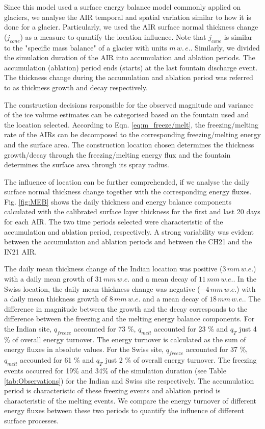 \documentclass[utf8]{frontiersSCNS}
\begin{document}
Since this model used a surface energy balance model commonly applied on glaciers, we analyse the AIR temporal
and spatial variation similar to how it is done for a glacier. Particularly, we used the AIR surface normal
thickness change ($j_{cone}$) as a measure to quantify the location influence. Note that $j_{cone}$ is similar
to the "specific mass balance" of a glacier with units $m \, w.\, e.$. Similarly, we divided the simulation duration
of the AIR into accumulation and ablation periods. The accumulation (ablation) period ends (starts) at the last
fountain discharge event. The thickness change during the accumulation and ablation period was referred to as
thickness growth and decay respectively.

The construction decisions responsible for the observed magnitude and variance of the ice volume estimates can
be categorised based on the fountain used and the location selected. According to Eqn.  \ref{eq:m_freeze/melt},
the freezing/melting rate of the AIRs can be decomposed to the corresponding freezing/melting energy and the
surface area. The construction location chosen determines the thickness growth/decay through the
freezing/melting energy flux and the fountain determines the surface area through its spray radius.

The influence of location can be further comprehended, if we analyse the daily surface normal thickness change
together with the corresponding energy fluxes. Fig. \ref{fig:MEB} shows the daily thickness and energy balance
components calculated with the calibrated surface layer thickness for the first and last 20 days for each AIR. The two time
periods selected were characteristic of the accumulation and ablation period, respectively. A strong variability
was evident between the accumulation and ablation periods and between the CH21 and the IN21 AIR.

The daily mean thickness change of the Indian location was positive ($3\, mm \,w.e.$) with a daily mean growth
of $31\, mm \,w.e.$ and a mean decay of $11\, mm \,w.e.$. In the Swiss location, the daily mean
thickness change was negative ($-4\, mm \,w.e.$) with a daily mean thickness growth of $8\, mm \,w.e.$ and a
mean decay of $18\, mm \,w.e.$. The difference in magnitude between the growth and the decay corresponds to the
difference between the freezing and the melting energy balance components. For the Indian site, $q_{freeze}$
accounted for 73 \%, $q_{melt}$ accounted for 23 \% and $q_{T}$ just 4 \% of overall energy turnover. The energy
turnover is calculated as the sum of energy fluxes in absolute values. For the Swiss site, $q_{freeze}$
accounted for 37 \%, $q_{melt}$ accounted for 61 \%  and $q_{T}$ just 2 \% of overall energy turnover. The
freezing events occurred for 19\% and 34\% of the simulation duration (see Table \ref{tab:Observations}) for the
Indian and Swiss site respectively. The accumulation period is characteristic of these freezing events and
ablation period is characteristic of the melting events. We compare the energy turnover of different energy
fluxes between these two periods to quantify the influence of different surface processes.
\end{document}
